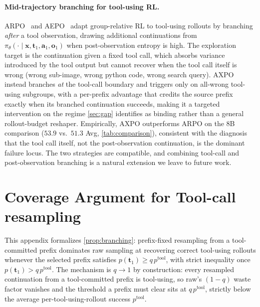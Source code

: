 \documentclass{llmxive}
\providecommand{\bm}[1]{\boldsymbol{#1}}
\providecommand{\Toolresample}{Tool-call resampling\xspace}
\providecommand{\va}{{\bm{a}}}
\providecommand{\vo}{{\bm{o}}}
\providecommand{\vt}{{\bm{t}}}
\providecommand{\vx}{{\bm{x}}}
\begin{document}
\paragraph{Mid-trajectory branching for tool-using RL.}
ARPO~\citep{arpo} and AEPO~\citep{aepo} adapt group-relative RL to tool-using rollouts by branching \emph{after} a tool observation, drawing additional continuations from $\pi_\theta(\cdot \mid \vx, \vt_1, \va_1, \vo_1)$ when post-observation entropy is high. The exploration target is the continuation given a fixed tool call, which absorbs variance introduced by the tool output but cannot recover when the tool call itself is wrong (wrong sub-image, wrong python code, wrong search query). AXPO instead branches \emph{at} the tool-call boundary and triggers only on all-wrong tool-using subgroups, with a per-prefix advantage that credits the source prefix exactly when its branched continuation succeeds, making it a targeted intervention on the regime \autoref{sec:gap} identifies as binding rather than a general rollout-budget reshaper. Empirically, AXPO outperforms ARPO on the 8B comparison ($53.9$ vs.\ $51.3$ Avg, \autoref{tab:comparison}), consistent with the diagnosis that the tool call itself, not the post-observation continuation, is the dominant failure locus. The two strategies are compatible, and combining tool-call and post-observation branching is a natural extension we leave to future work.

\section{Coverage Argument for \Toolresample}
\label{app:coverage}

This appendix formalizes \autoref{prop:branching}: prefix-fixed resampling from a tool-committed prefix dominates raw sampling at recovering correct tool-using rollouts whenever the selected prefix satisfies $p(\vt_1) \geq q\, p^{\text{tool}}$, with strict inequality once $p(\vt_1) > q\, p^{\text{tool}}$. The mechanism is $q \to 1$ by construction: every resampled continuation from a tool-committed prefix is tool-using, so raw's $(1-q)$ waste factor vanishes and the threshold a prefix must clear sits at $q\, p^{\text{tool}}$, strictly below the average per-tool-using-rollout success $p^{\text{tool}}$.
\end{document}

